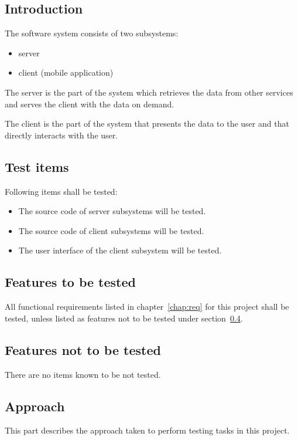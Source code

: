 \documentclass[11pt]{book}
\begin{document}
\subsection{Introduction}
The \systemname software system consists of two subsystems:

\begin{itemize}
    \item server
    \item client (mobile application)
\end{itemize}

The server is the part of the system which retrieves the data from other services and serves the client with the data on demand.

The client is the part of the system that presents the data to the user and that directly interacts with the user.

\subsection{Test items}
Following items shall be tested:

\begin{itemize}
    \item The source code of server subsystems will be tested.
    \item The source code of client subsystems will be tested.
    \item The user interface of the client subsystem will be tested.
\end{itemize}

\subsection{Features to be tested} \label{sec:test_plan_features_tested}
All functional requirements listed in chapter~\ref{chap:req} for this project shall be tested, unless listed as features not to be tested under section~\ref{sec:test_plan_features_not_tested}.

\subsection{Features not to be tested} \label{sec:test_plan_features_not_tested}
There are no items known to be not tested.

\subsection{Approach}
This part describes the approach taken to perform testing tasks in this project.
\end{document}
